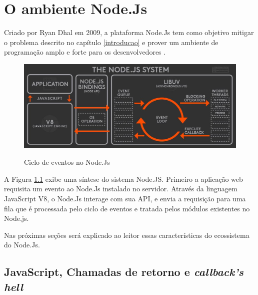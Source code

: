 \chapter{O ambiente Node.Js}
\label{ambiente-node-js}



  Criado por Ryan Dhal em 2009, a plataforma Node.Js tem como objetivo mitigar o problema descrito no capítulo \ref{introducao}
  e prover um ambiente de programação amplo e forte para os desenvolvedores \cite{hughes}.
  
    \begin{figure}[H]
    \setlength{\abovecaptionskip}{0pt}
    \setlength{\belowcaptionskip}{0pt}
    \caption[Ciclo de eventos no Node.Js]{Ciclo de eventos no Node.Js}
    \centering
    \includegraphics[width=.85\textwidth]{imagem/node-js-system-twitter-BusyRich.png}
    \captionsetup{justification=centering}
    \label{fig:node-js-system-loop}
  \end{figure}
  
  A Figura \ref{fig:node-js-system-loop} exibe uma síntese do sistema Node.JS. Primeiro a aplicação web requisita um evento 
  ao Node.Js instalado no servidor. Através da linguagem JavaScript V8, o Node.Js interage com sua \ac{API}, e envia 
  a requisição para uma fila que é processada pelo ciclo de eventos e tratada pelos módulos existentes no Node.js. 
  
  Nas próximas seções será explicado ao leitor essas características do ecossistema do Node.Js.
 
\section{JavaScript, Chamadas de retorno e \textit{callback's hell}}
\label{chamadas-de-retorno-e-callback-hell}

